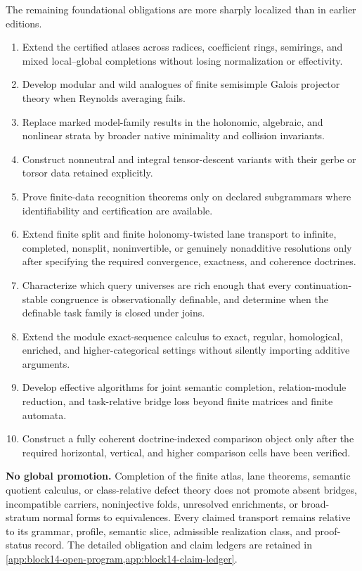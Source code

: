 The remaining foundational obligations are more sharply localized than in earlier editions.
\begin{enumerate}
\item Extend the certified atlases across radices, coefficient rings, semirings, and mixed local--global completions without losing normalization or effectivity.
\item Develop modular and wild analogues of finite semisimple Galois projector theory when Reynolds averaging fails.
\item Replace marked model-family results in the holonomic, algebraic, and nonlinear strata by broader native minimality and collision invariants.
\item Construct nonneutral and integral tensor-descent variants with their gerbe or torsor data retained explicitly.
\item Prove finite-data recognition theorems only on declared subgrammars where identifiability and certification are available.
\item Extend finite split and finite holonomy-twisted lane transport to infinite, completed, nonsplit, noninvertible, or genuinely nonadditive resolutions only after specifying the required convergence, exactness, and coherence doctrines.
\item Characterize which query universes are rich enough that every continuation-stable congruence is observationally definable, and determine when the definable task family is closed under joins.
\item Extend the module exact-sequence calculus to exact, regular, homological, enriched, and higher-categorical settings without silently importing additive arguments.
\item Develop effective algorithms for joint semantic completion, relation-module reduction, and task-relative bridge loss beyond finite matrices and finite automata.
\item Construct a fully coherent doctrine-indexed comparison object only after the required horizontal, vertical, and higher comparison cells have been verified.
\end{enumerate}

\begin{boundarybox}
\textbf{No global promotion.}
Completion of the finite atlas, lane theorems, semantic quotient calculus, or class-relative defect theory does not promote absent bridges, incompatible carriers, noninjective folds, unresolved enrichments, or broad-stratum normal forms to equivalences.  Every claimed transport remains relative to its grammar, profile, semantic slice, admissible realization class, and proof-status record.  The detailed obligation and claim ledgers are retained in \cref{app:block14-open-program,app:block14-claim-ledger}.
\end{boundarybox}
